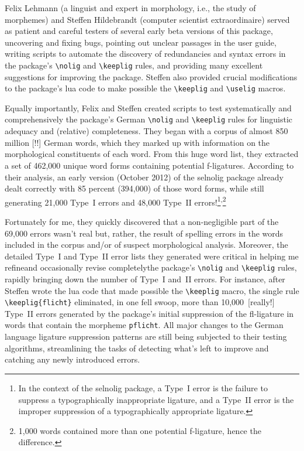 \documentclass[11pt]{article}
\newcommand{\pkg}[1]{\textsf{#1}}
\newcommand{\opt}[1]{\texttt{#1}}
\newcommand{\cmmd}[1]{\texttt{\textbackslash #1}}
\begin{document}
Felix Lehmann (a linguist and expert in morphology, i.e., the study of morphemes) and Steffen Hildebrandt (computer scientist extraordinaire) served as patient and careful testers of several early beta versions of this package, uncovering and fixing bugs, pointing out unclear passages in the user guide, writing scripts to automate the discovery of redundancies and syntax errors in the package's \cmmd{nolig} and \cmmd{keeplig} rules, and providing many excellent suggestions for improving the package. Steffen also provided crucial modifications to the package's lua code to make possible the \cmmd{keeplig} and \cmmd{uselig} macros.

Equally importantly, Felix and Steffen created scripts to test systematically and comprehensively the package's German \cmmd{nolig} and \cmmd{keeplig} rules for linguistic adequacy and (relative) completeness.
They began with a corpus of almost 850 million [!!] German words, which they marked up with information on the morphological constituents of each word. From this huge word list, they extracted a set of 462,000 unique word forms containing potential f-ligatures.
According to their analysis, an early version (October 2012) of the \pkg{selnolig} package already dealt correctly with 85 percent (394,000) of those word forms, while still generating 21,000 Type~I errors and 48,000 Type~II errors!\footnote{In the context of the \pkg{selnolig} package, a Type~I error is the failure to suppress a typographically inappropriate ligature, and a Type~II error is the improper suppression of a typographically appropriate ligature.}\textsuperscript{,}\footnote{1,000 words contained more than one potential f-ligature, hence the difference.} 

\enlargethispage{0.3\baselineskip}

Fortunately for me, they quickly discovered that a non-negligible part of the 69,000 errors wasn't real but, rather, the result of spelling errors in the words included in the corpus and/or of suspect morphological analysis. Moreover, the detailed Type~I and Type~II error lists they generated were critical in helping me refine\textemdash and occasionally revise completely\textemdash the package's \cmmd{nolig} and \cmmd{keeplig} rules, rapidly bringing down the number of Type~I and~II errors. For instance, after Steffen wrote the lua code that made possible the \cmmd{keeplig} macro, the single rule \Verb+\keeplig{flicht}+ eliminated, in one fell swoop, more than 10,000~[really!] Type~II errors generated by the package's initial suppression of the fl-ligature in words that contain the morpheme \opt{pflicht}. All major changes to the German language ligature suppression patterns are still being subjected to their testing algorithms, streamlining the tasks of detecting what's left to improve and catching any newly introduced errors.
\end{document}
